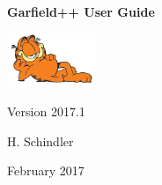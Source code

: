 \begin{titlepage}
  {
  \centering
  \sffamily
  \linespread{1.5}

  \vspace{3cm} 

  \huge{\textbf{Garfield++ User Guide}}

  \vspace{2cm}

  \includegraphics[width=0.2\textwidth]{garfield.jpg}

  \vspace{2cm}

  \large
  Version 2017.1 

  \vspace{2cm}
  \large
  H. Schindler

  \vfill

  February 2017

  }
\end{titlepage}
